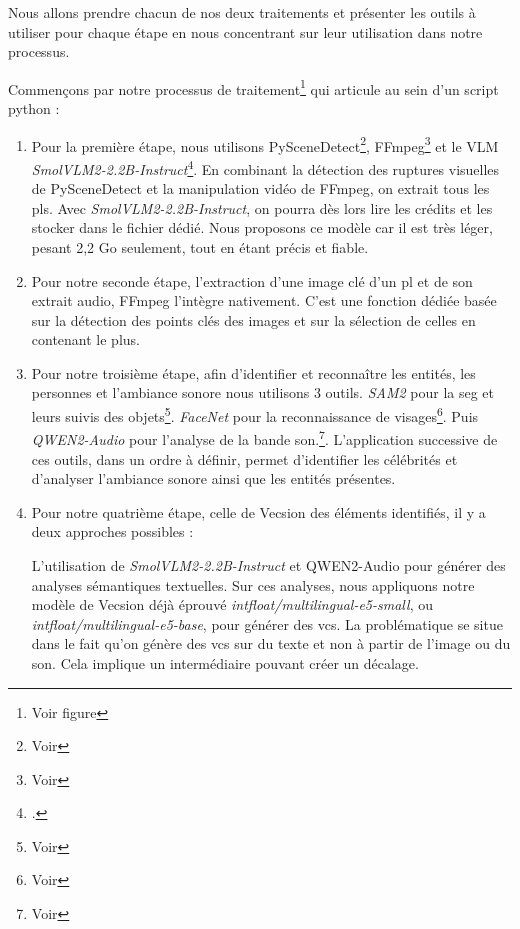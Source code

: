 Nous allons prendre chacun de nos deux traitements et présenter les outils à utiliser pour chaque étape en nous concentrant sur leur utilisation dans notre processus.\newline

Commençons par notre processus de traitement\footnote{Voir figure } qui articule au sein d'un script python :

\begin{enumerate}
	
	\item Pour la première étape, nous utilisons PySceneDetect\footnote{Voir }, FFmpeg\footnote{Voir } et le \gls{VLM} \textit{SmolVLM2-2.2B-Instruct}\footcite{HuggingFaceTBSmolVLM222BInstructHugging2024}. En combinant la détection des ruptures visuelles de PySceneDetect et la manipulation vidéo de FFmpeg, on extrait tous les \glspl{pl}. Avec \textit{SmolVLM2-2.2B-Instruct}, on pourra dès lors lire les crédits et les stocker dans le fichier \J dédié. Nous proposons ce modèle car il est très léger, pesant 2,2 Go seulement, tout en étant précis et fiable. 
	
	\item Pour notre seconde étape, l'extraction d'une image clé d'un \gls{pl} et de son extrait audio, FFmpeg l'intègre nativement. C'est une fonction dédiée basée sur la détection des points clés des images et sur la sélection de celles en contenant le plus.
	
	\item Pour notre troisième étape, afin d'identifier et reconnaître les entités, les personnes et l'ambiance sonore nous utilisons 3 outils. \textit{SAM2} pour la \gls{seg} et leurs suivis des objets\footnote{Voir }. \textit{FaceNet} pour la reconnaissance de visages\footnote{Voir }. Puis \textit{QWEN2-Audio} pour l'analyse de la bande son.\footnote{Voir }. L'application successive de ces outils, dans un ordre à définir, permet d'identifier les célébrités et d'analyser l'ambiance sonore ainsi que les entités présentes. 
	
	\item Pour notre quatrième étape, celle de \gls{Vecsion} des éléments identifiés, il y a deux approches possibles : 
	
	\subitem L'utilisation de \textit{SmolVLM2-2.2B-Instruct} et QWEN2-Audio pour générer des analyses sémantiques textuelles. Sur ces analyses, nous appliquons notre modèle de \gls{Vecsion} déjà éprouvé \textit{intfloat/multilingual-e5-small}, ou \textit{intfloat/multilingual-e5-base}, pour générer des \gls{vcs}. La problématique se situe dans le fait qu'on génère des \gls{vcs} sur du texte et non à partir de l'image ou du son. Cela implique un intermédiaire pouvant créer un décalage.
	

\end{enumerate}
